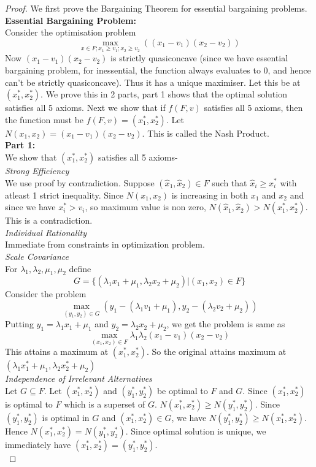 \documentclass{article}
\theoremstyle{definition}
\begin{document}
\begin{proof}
We first prove the Bargaining Theorem for essential bargaining problems.\\
\textbf{Essential Bargaining Problem:}\\
Consider the optimisation problem $$\max_{x\in F;x_1\geq v_1;x_2\geq v_2} ((x_1 - v_1)(x_2 - v_2))$$ Now $(x_1-v_1)(x_2-v_2)$ is strictly quasiconcave (since we have essential bargaining problem, for inessential, the function always evaluates to $0$, and hence can't be strictly quasiconcave). Thus it has a unique maximiser. Let this be at $(x_1^*,x_2^*)$. We prove this in 2 parts, part 1 shows that the optimal solution satisfies all 5 axioms. Next we show that if $f(F,v)$ satisfies all 5 axioms, then the function must be $f(F,v) = (x_1^*,x_2^*)$. Let $N(x_1,x_2) = (x_1-v_1)(x_2-v_2)$. This is called the Nash Product.\\

\textbf{Part 1:}\\
We show that $(x_1^*,x_2^*)$ satisfies all 5 axioms-\\

\textit{Strong Efficiency}\\
We use proof by contradiction. Suppose $(\hat{x}_1,\hat{x}_2)\in F$ such that $\hat{x}_i\geq x_i^*$ with atleast 1 strict inequality. Since $N(x_1,x_2)$ is increasing in both $x_1$ and $x_2$ and since we have $x_i^*>v_i$, so maximum value is non zero, $N(\hat{x}_1,\hat{x}_2) > N(x_1^*,x_2^*)$. This is a contradiction.\\

\textit{Individual Rationality}\\
Immediate from constraints in optimization problem.\\

\textit{Scale Covariance}\\
For $\lambda_1,\lambda_2,\mu_1,\mu_2$ define $$G = \{(\lambda_1x_1 + \mu_1, \lambda_2x_2 + \mu_2)|(x_1,x_2)\in F\}$$
Consider the problem $$\max_{(y_1,y_2)\in G}(y_1 - (\lambda_1v_1 + \mu_1),y_2 - (\lambda_2v_2 + \mu_2))$$
Putting $y_1 = \lambda_1x_1 + \mu_1$ and $y_2 = \lambda_2x_2 + \mu_2$, we get the problem is same as $$\max_{(x_1,x_2)\in F} \lambda_1\lambda_2 (x_1-v_1)(x_2-v_2)$$
This attains a maximum at $(x_1^*,x_2^*)$. So the original attains maximum at $(\lambda_1x_1^* + \mu_1, \lambda_2x_2^* + \mu_2)$\\

\textit{Independence of Irrelevant Alternatives}\\
Let $G\subseteq F$. Let $(x_1^*,x_2^*)$ and $(y_1^*,y_2^*)$ be optimal to $F$ and $G$. Since $(x_1^*,x_2^*)$ is optimal to $F$ which is a superset of $G$. $N(x_1^*,x_2^*) \geq N(y_1^*,y_2^*)$. Since $(y_1^*,y_2^*)$ is optimal in $G$ and $(x_1^*,x_2^*) \in G$, we have $N(y_1^*,y_2^*)\geq N(x_1^*,x_2^*)$. Hence $N(x_1^*,x_2^*) = N(y_1^*,y_2^*)$. Since optimal solution is unique, we immediately have $(x_1^*,x_2^*) = (y_1^*,y_2^*)$.\\


\end{proof}
\end{document}
